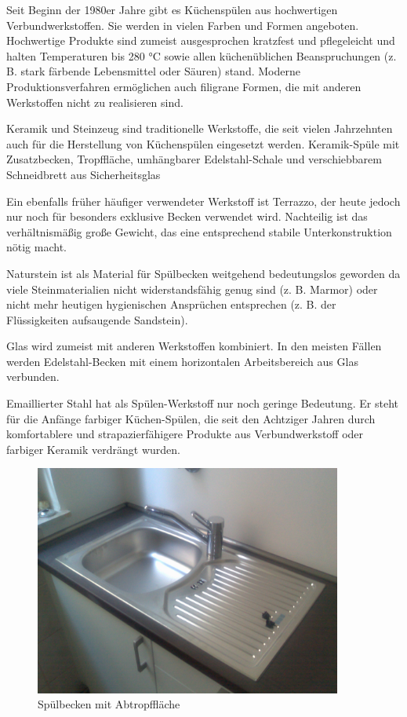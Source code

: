 Seit Beginn der 1980er Jahre gibt es Küchenspülen aus hochwertigen Verbundwerkstoffen. Sie werden in vielen Farben und Formen angeboten. Hochwertige Produkte sind zumeist ausgesprochen kratzfest und pflegeleicht und halten Temperaturen bis 280 °C sowie allen küchenüblichen Beanspruchungen (z. B. stark färbende Lebensmittel oder Säuren) stand. Moderne Produktionsverfahren ermöglichen auch filigrane Formen, die mit anderen Werkstoffen nicht zu realisieren sind.

Keramik und Steinzeug sind traditionelle Werkstoffe, die seit vielen Jahrzehnten auch für die Herstellung von Küchenspülen eingesetzt werden.
Keramik-Spüle mit Zusatzbecken, Tropffläche, umhängbarer Edelstahl-Schale und verschiebbarem Schneidbrett aus Sicherheitsglas

Ein ebenfalls früher häufiger verwendeter Werkstoff ist Terrazzo, der heute jedoch nur noch für besonders exklusive Becken verwendet wird. Nachteilig ist das verhältnismäßig große Gewicht, das eine entsprechend stabile Unterkonstruktion nötig macht.

Naturstein ist als Material für Spülbecken weitgehend bedeutungslos geworden da viele Steinmaterialien nicht widerstandsfähig genug sind (z. B. Marmor) oder nicht mehr heutigen hygienischen Ansprüchen entsprechen (z. B. der Flüssigkeiten aufsaugende Sandstein).

Glas wird zumeist mit anderen Werkstoffen kombiniert. In den meisten Fällen werden Edelstahl-Becken mit einem horizontalen Arbeitsbereich aus Glas verbunden. \cite{RltlConv}

Emaillierter Stahl hat als Spülen-Werkstoff nur noch geringe Bedeutung. Er steht für die Anfänge farbiger Küchen-Spülen, die seit den Achtziger Jahren durch komfortablere und strapazierfähigere Produkte aus Verbundwerkstoff oder farbiger Keramik verdrängt wurden. \cite{codecommit}


\begin{figure}[ht]
	\centering
  \includegraphics[width=0.9\textwidth]{Spuelbecken.jpg}
	\caption{Spülbecken mit Abtropffläche}
	\label{fig1}
\end{figure}


